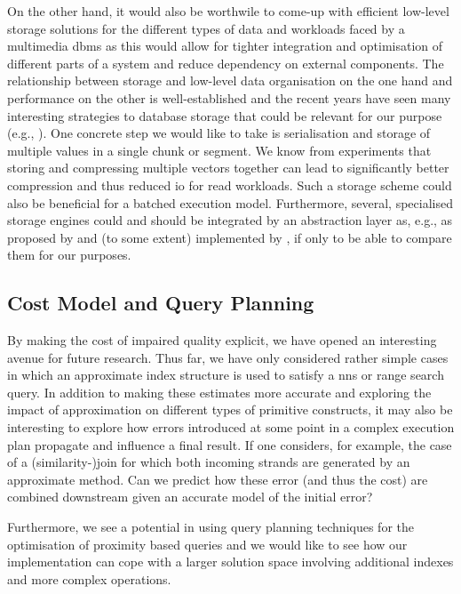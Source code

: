 On the other hand, it would also be worthwile to come-up with efficient low-level storage solutions for the different types of data and workloads faced by a multimedia \acrshort{dbms} as this would allow for tighter integration and optimisation of different parts of a system and reduce dependency on external components. The relationship between storage and low-level data organisation on the one hand and performance on the other is well-established \cite{Lejsek:2009NVTree,Lejsek:2011NVTree,Hojsgaard:2019Index} and the recent years have seen many interesting strategies to database storage that could be relevant for our purpose (e.g., \cite{Idreos:2012MonetDB,Sears:2012Blsm}). One concrete step we would like to take is serialisation and storage of multiple values in a single chunk or segment. We know from experiments that storing and compressing multiple vectors together can lead to significantly better compression and thus reduced \acrshort{io} for read workloads. Such a storage scheme could also be beneficial for a batched execution model. Furthermore, several, specialised storage engines could and should be integrated by an abstraction layer as, e.g., as proposed by \cite{Dittrich:2011Towards,Alagiannis:2014H2O} and (to some extent) implemented by \cottontail{}, if only to be able to compare them for our purposes.

\subsection{Cost Model and Query Planning}
By making the cost of impaired quality explicit, we have opened an interesting avenue for future research. Thus far, we have only considered rather simple cases in which an approximate index structure is used to satisfy a \acrshort{nns} or range search query. In addition to making these estimates more accurate and exploring the impact of approximation on different types of primitive constructs, it may also be interesting to explore how errors introduced at some point in a complex execution plan propagate and influence a final result. If one considers, for example, the case of a (similarity-)join for which both incoming strands are generated by an approximate method. Can we predict how these error (and thus the cost) are combined downstream given an accurate model of the initial error?

Furthermore, we see a potential in using query planning techniques for the optimisation of proximity based queries and we would like to see how our implementation can cope with a larger solution space involving additional indexes and more complex operations.

